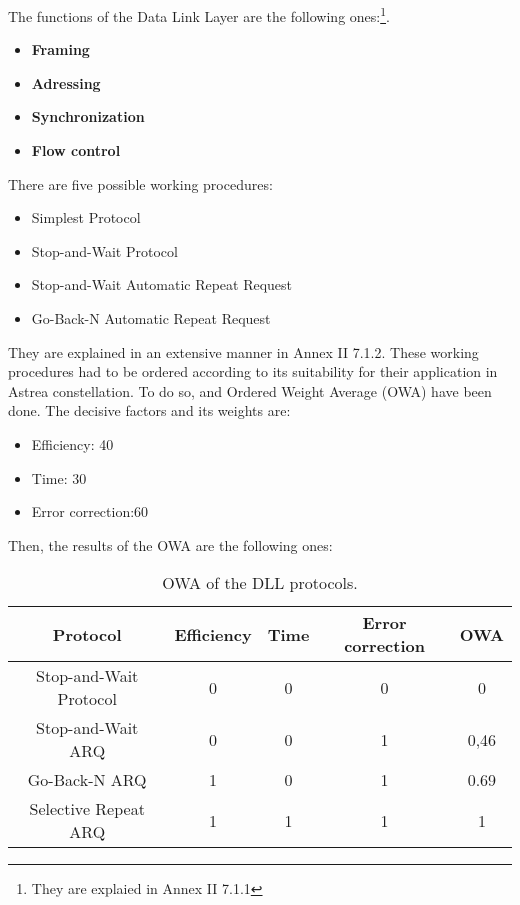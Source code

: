 %
The functions of the Data Link Layer are the following ones:\footnote{They are explaied in Annex II 7.1.1}.
\begin{itemize}
\item \textbf{Framing}
\item \textbf{Adressing}
\item \textbf{Synchronization}
\item \textbf{Flow control}
 \end{itemize}
There are five possible working procedures:
\begin{itemize}
\item Simplest Protocol
\item Stop-and-Wait Protocol
\item Stop-and-Wait Automatic Repeat Request
\item Go-Back-N Automatic Repeat Request
\end{itemize}
They are explained in an extensive manner in Annex II 7.1.2. These working procedures had to be ordered according to its suitability for their application in Astrea constellation. To do so, and Ordered Weight Average (OWA) have been done. The decisive factors and its weights are: 
\begin{itemize}
\item Efficiency: 40
\item Time: 30
\item Error correction:60
\end{itemize}
Then, the results of the OWA are the following ones:
\begin{table}[H]
\begin{center}
\begin{tabular}{ | c | c | c | c | c |}
\hline
Protocol&Efficiency&Time&Error correction&OWA\\
\hline
Stop-and-Wait Protocol&0&0&0&0\\
\hline
Stop-and-Wait ARQ&0&0&1&0,46\\
\hline
Go-Back-N ARQ&1&0&1&0.69\\
\hline
Selective Repeat ARQ&1&1&1&1\\
\hline
\end{tabular}
\caption{OWA of the DLL protocols.}
\end{center}
\end{table} 
